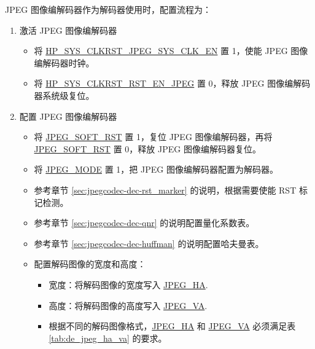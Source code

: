 \documentclass[main\_\_CN.tex]{subfiles}
\begin{document}
JPEG 图像编解码器作为解码器使用时，配置流程为：
\begin{enumerate}
    \item 激活 JPEG 图像编解码器
    \begin{itemize}
        \item 将 \hyperref[fielddesc:HPSYSCLKRSTJPEGSYSCLKEN]{HP\_SYS\_CLKRST\_JPEG\_SYS\_CLK\_EN} 置 1，使能 JPEG 图像编解码器时钟。
        \item 将 \hyperref[fielddesc:HPSYSCLKRSTRSTENJPEG]{HP\_SYS\_CLKRST\_RST\_EN\_JPEG} 置 0，释放 JPEG 图像编解码器系统级复位。
    \end{itemize}
    \item 配置 JPEG 图像编解码器
    \begin{itemize}
        \item 将 \hyperref[fielddesc:JPEGSOFTRST]{JPEG\_SOFT\_RST} 置 1，复位 JPEG 图像编解码器，再将 \hyperref[fielddesc:JPEGSOFTRST]{JPEG\_SOFT\_RST} 置 0，释放 JPEG 图像编解码器复位。
        \item 将 \hyperref[fielddesc:JPEGMODE]{JPEG\_MODE} 置 1，把 JPEG 图像编解码器配置为解码器。
        \item 参考章节 \ref{sec:jpegcodec-dec-rst_marker} 的说明，根据需要使能 RST 标记检测。
        \item 参考章节 \ref{sec:jpegcodec-dec-qnr} 的说明配置量化系数表。
        \item 参考章节 \ref{sec:jpegcodec-dec-huffman} 的说明配置哈夫曼表。
        \item 配置解码图像的宽度和高度：
        \begin{itemize}
            \item 宽度：将解码图像的宽度写入 \hyperref[fielddesc:JPEGHA]{JPEG\_HA}.
            \item 高度：将解码图像的高度写入 \hyperref[fielddesc:JPEGVA]{JPEG\_VA}.
            \item 根据不同的解码图像格式，\hyperref[fielddesc:JPEGHA]{JPEG\_HA} 和 \hyperref[fielddesc:JPEGVA]{JPEG\_VA} 必须满足表 \ref{tab:de_jpeg_ha_va} 的要求。

\end{itemize}
\end{itemize}
\end{enumerate}
\end{document}

